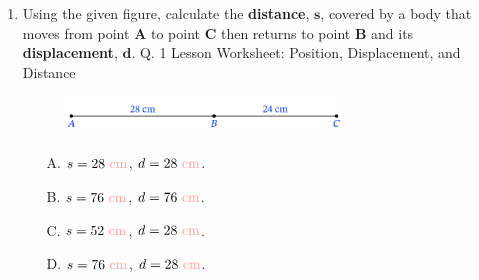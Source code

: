 \documentclass[A4,12pt]{article}
\begin{document}
\begin{enumerate}[label=\bfseries (\arabic*)]
\item Using the given figure, calculate the \textbf{distance}, $\bm s$, covered by a body that moves from point $\bm A$ to point $\bm C$ then returns to point $\bm B$ and its \textbf{displacement}, $\bm d$. \cite{Nagwa} Q. 1 Lesson Worksheet: Position, Displacement, and Distance
%
\begin{figure}[H]
    \centering
    \includegraphics[width=0.7\textwidth]{Nagwa_Q1_D.png}
\end{figure}
%
\begin{multicols}{2}
\begin{itemize}
    \item[A.] $s=\cmcgs{28}$, $d=\cmcgs{28}$.
    \item[B.] $s=\cmcgs{76}$, $d=\cmcgs{76}$.
    \item[C.] $s=\cmcgs{52}$, $d=\cmcgs{28}$.
    \item[D.] $s=\cmcgs{76}$, $d=\cmcgs{28}$.
\end{itemize}
\end{multicols}
%

\end{enumerate}
\end{document}
